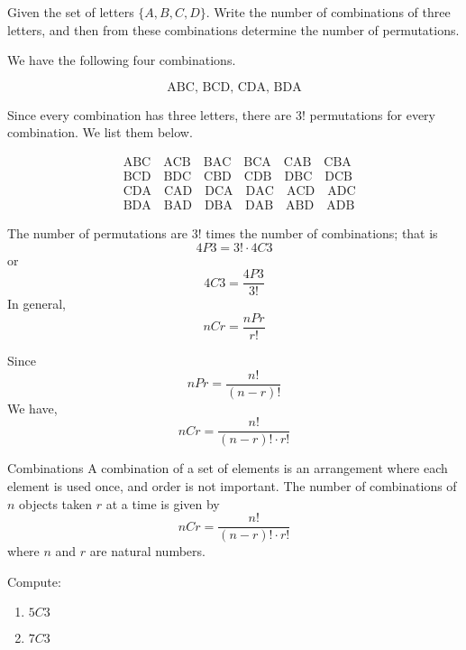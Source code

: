 \begin{example}
    Given the set of letters $\{A, B, C, D\}$. Write the number of combinations of three letters, and then from these combinations determine the number of permutations.
\end{example}

\begin{solution}
    We have the following four combinations.

    \[
        \text{ABC, BCD, CDA, BDA}
    \]

    Since every combination has three letters, there are $3!$ permutations for every combination. We list them below.

    \[
        \begin{aligned}
             & \text{ABC} \quad \text{ACB} \quad \text{BAC} \quad \text{BCA} \quad \text{CAB} \quad \text{CBA} \\
             & \text{BCD} \quad \text{BDC} \quad \text{CBD} \quad \text{CDB} \quad \text{DBC} \quad \text{DCB} \\
             & \text{CDA} \quad \text{CAD} \quad \text{DCA} \quad \text{DAC} \quad \text{ACD} \quad \text{ADC} \\
             & \text{BDA} \quad \text{BAD} \quad \text{DBA} \quad \text{DAB} \quad \text{ABD} \quad \text{ADB}
        \end{aligned}
    \]
\end{solution}

The number of permutations are \(3!\) times the number of combinations; that is
\[
    4P3 = 3! \cdot 4C3
\]
or
\[
    4C3 = \frac{4P3}{3!}
\]
In general, \[ nCr = \frac{nPr}{r!} \]

Since
\[
    nPr = \frac{n!}{(n-r)!}
\]
We have,
\[
    nCr = \frac{n!}{(n-r)! \cdot r!}
\]

\begin{summarybox}{Combinations}
    A combination of a set of elements is an arrangement where each element is used once, and order is not important. The number of combinations of $n$ objects taken $r$ at a time is given by
    \[
        nCr = \frac{n!}{(n-r)! \cdot r!}
    \]
    where $n$ and $r$ are natural numbers.
\end{summarybox}

\begin{example}
    Compute:
    \begin{enumerate}
        \item $5C3$
        \item $7C3$
    \end{enumerate}
\end{example}

